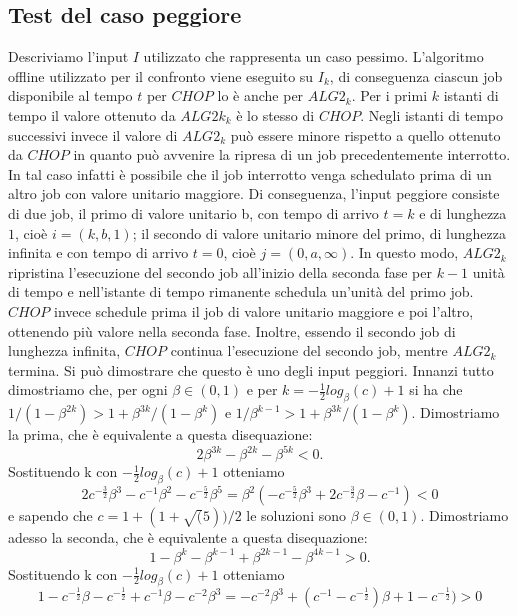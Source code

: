 \documentclass[twoside,openany,titlepage,fleqn,
	headinclude,12pt,a4paper,BCOR5mm,footinclude]{scrbook}
\begin{document}
\subsection{Test del caso peggiore}
Descriviamo l'input $I$ utilizzato che rappresenta un caso pessimo. L'algoritmo offline utilizzato per il confronto viene eseguito su $I_{k}$, di conseguenza ciascun job disponibile al tempo $t$ per $CHOP$ lo è anche per $ALG2_{k}$. Per i primi $k$ istanti di tempo il valore ottenuto da $ALG2k_{k}$ è lo stesso di $CHOP$. Negli istanti di tempo successivi invece il valore di $ALG2_{k}$ può essere minore rispetto a quello ottenuto da $CHOP$ in quanto può avvenire la ripresa di un job precedentemente interrotto. In tal caso infatti è possibile che il job interrotto venga schedulato prima di un altro job con valore unitario maggiore. Di conseguenza, l'input peggiore consiste di due job, il primo di valore unitario b, con tempo di arrivo $t = k$ e di lunghezza $1$, cioè $i = (k, b, 1)$; il secondo di valore unitario minore del primo, di lunghezza infinita e con tempo di arrivo $t = 0$, cioè $j = (0, a, \infty)$. In questo modo, $ALG2_{k}$ ripristina l'esecuzione del secondo job all'inizio della seconda fase per $k - 1$ unità di tempo e nell'istante di tempo rimanente schedula un'unità del primo job. $CHOP$ invece schedule prima il job di valore unitario maggiore e poi l'altro, ottenendo più valore nella seconda fase. Inoltre, essendo il secondo job di lunghezza infinita, $CHOP$ continua l'esecuzione del secondo job, mentre $ALG2_{k}$ termina. Si può dimostrare che questo è uno degli input peggiori. Innanzi tutto dimostriamo che, per ogni $\beta \in (0,1)$ e per $k = -\frac{1}{2}log_{\beta}(c) + 1$ si ha che $1/(1 - \beta^{2k}) > 1 + \beta^{3k}/(1 - \beta^{k})$ e $1/\beta^{k-1} > 1 + \beta^{3k}/(1 - \beta^{k})$. Dimostriamo la prima, che è equivalente a questa disequazione: 
$$2\beta^{3k} - \beta^{2k} - \beta^{5k} < 0.$$
Sostituendo k con $-\frac{1}{2}log_{\beta}(c) + 1$ otteniamo 
$$2c^{-\frac{3}{2}}\beta^{3} - c^{-1}\beta^{2} - c^{-\frac{5}{2}}\beta^{5} = \beta^{2}(-c^{-\frac{5}{2}}\beta^{3} +2c^{-\frac{3}{2}}\beta - c^{-1}) < 0$$
e sapendo che $c=1 + (1 + \sqrt(5))/2$ le soluzioni sono $\beta \in (0,1)$. Dimostriamo adesso la seconda, che è equivalente a questa disequazione:
$$1 - \beta^{k} - \beta^{k-1} + \beta^{2k -1} - \beta^{4k - 1} > 0.$$
Sostituendo k con $-\frac{1}{2}log_{\beta}(c) + 1$ otteniamo 
$$1 - c^{-\frac{1}{2}}\beta - c^{-\frac{1}{2}} + c^{-1}\beta - c^{-2}\beta^{3} = -c^{-2}\beta^{3} + (c^{-1} - c^{-\frac{1}{2}})\beta + 1 - c^{-\frac{1}{2}}) > 0$$
\end{document}
